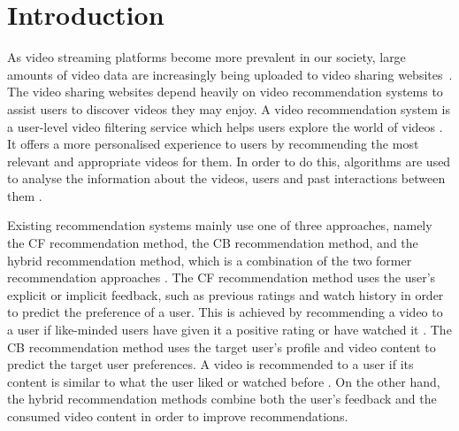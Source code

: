 \documentclass[review]{elsarticle}
\begin{document}
\section{Introduction}
\insert{}
As video streaming platforms become more prevalent in our society, large amounts of video data are increasingly being uploaded to video sharing websites~\citep{Frahm_2017_CVPR_Workshops}. The video sharing websites depend heavily on video recommendation systems to assist users to discover videos they may enjoy. A video recommendation system is a user-level video filtering service which helps users explore the world of videos \citep{adomavicius2005toward}. It offers a more personalised experience to users by recommending the most relevant and appropriate videos for them. In order to do this, algorithms are used to analyse the information about the videos, users and past interactions between them \citep{gomez2016netflix,lu2015recommender}.


Existing recommendation systems mainly use one of three approaches, namely the \ac{CF} recommendation method, the \ac{CB} recommendation method, and the hybrid recommendation method, which is a combination of the two former recommendation approaches \citep{adomavicius2005toward}. The \ac{CF} recommendation method uses the user's explicit or implicit feedback, such as previous ratings and watch history in order to predict the preference of a user. This is achieved by recommending a video to a user if like-minded users have given it a positive rating or have watched it \citep{adomavicius2005toward}. The \ac{CB} recommendation method uses the target user's profile and video content to predict the target user preferences. A video is recommended to a user if its content is similar to what the user liked or watched before \citep{lops2011content}. On the other hand, the hybrid recommendation methods combine both the user's feedback and the consumed video content in order to improve recommendations. 
\end{document}
